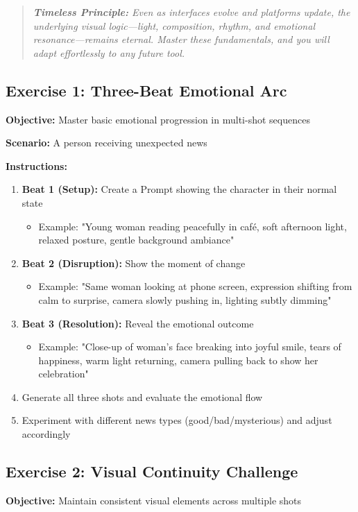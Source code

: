 \begin{quote}
\textit{\textbf{Timeless Principle:} Even as interfaces evolve and platforms update, the underlying visual logic---light, composition, rhythm, and emotional resonance---remains eternal. Master these fundamentals, and you will adapt effortlessly to any future tool.}
\end{quote}

\subsection*{Exercise 1: Three-Beat Emotional Arc}
\textbf{Objective:} Master basic emotional progression in multi-shot sequences

\textbf{Scenario:} A person receiving unexpected news

\textbf{Instructions:}
\begin{enumerate}
\item \textbf{Beat 1 (Setup):} Create a Prompt showing the character in their normal state
   \begin{itemize}
   \item Example: "Young woman reading peacefully in café, soft afternoon light, relaxed posture, gentle background ambiance"
   \end{itemize}
\item \textbf{Beat 2 (Disruption):} Show the moment of change
   \begin{itemize}
   \item Example: "Same woman looking at phone screen, expression shifting from calm to surprise, camera slowly pushing in, lighting subtly dimming"
   \end{itemize}
\item \textbf{Beat 3 (Resolution):} Reveal the emotional outcome
   \begin{itemize}
   \item Example: "Close-up of woman's face breaking into joyful smile, tears of happiness, warm light returning, camera pulling back to show her celebration"
   \end{itemize}
\item Generate all three shots and evaluate the emotional flow
\item Experiment with different news types (good/bad/mysterious) and adjust accordingly
\end{enumerate}

\subsection*{Exercise 2: Visual Continuity Challenge}
\textbf{Objective:} Maintain consistent visual elements across multiple shots

